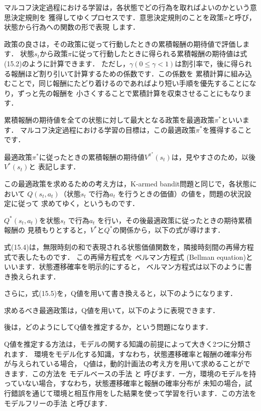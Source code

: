 
マルコフ決定過程における学習は，各状態でどの行為を取ればよいのかという意思決定規則を
獲得してゆくプロセスです．意思決定規則のことを政策$\pi$と呼び，状態から行為への関数の形で表現
します．

政策の良さは，その政策に従って行動したときの累積報酬の期待値で評価します．
状態$s_t$から政策$\pi$に従って行動したときに得られる累積報酬の期待値は式(15.2)のように計算できます．
ただし，$\gamma (0 \le \gamma < 1)$は割引率で，後に得られる報酬ほど割り引いて計算するための係数です．この係数を
累積計算に組み込むことで，同じ報酬にたどり着けるのであればより短い手順を優先することになり，ずっと先の報酬を
小さくすることで累積計算を収束させることにもなります．

累積報酬の期待値を全ての状態に対して最大となる政策を最適政策$\pi^*$といいます．
マルコフ決定過程における学習の目標は，この最適政策$\pi^*$を獲得することです．


最適政策$\pi^*$に従ったときの累積報酬の期待値$V^{\pi^*} (s_t)$は，見やすさのため，以後$V^* (s_t)$と
表記します．

この最適政策を求めるための考え方は，K-armed bandit問題と同じで，各状態において
$Q(s_t, a_t)$（状態$s_t$ で行為$a_t$ を行うときの価値）の値を，問題の状況設定に従って
求めてゆく，というものです．

$Q^*(s_t, a_t)$を状態$s_t$ で行為$a_t$ を行い，その後最適政策に従ったときの期待累積報酬の
見積もりとすると，$V^*$と$Q^*$の関係から，以下の式が導けます．


式(15.4)は，無限時刻の和で表現される状態価値関数を，隣接時刻間の再帰方程式で表したものです．
この再帰方程式を
ベルマン方程式 
(Bellman equation)といいます．状態遷移確率を明示的にすると，
ベルマン方程式は以下のように書き換えられます．

さらに，式(15.5)を，Q値を用いて書き換えると，以下のようになります．

求めるべき最適政策は，Q値を用いて，以下のように表現できます．

後は，どのようにしてQ値を推定するか，という問題になります．


Q値を推定する方法は，モデルの関する知識の前提によって大きく2つに分類されます．
環境をモデル化する知識，すなわち，状態遷移確率と報酬の確率分布が与えられている場合，
Q値は，動的計画法の考え方を用いて求めることができます．この方法を
モデルベースの手法 と
呼びます．一方，環境のモデルを持っていない場合，すなわち，状態遷移確率と報酬の確率分布が
未知の場合，試行錯誤を通じて環境と相互作用をした結果を使って学習を行います．この方法を
モデルフリーの手法 と呼びます．


